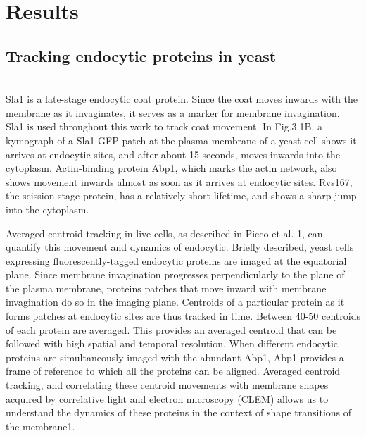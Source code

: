 \chapter{Results}    
\label{Ch:results}

\section{Tracking endocytic proteins in yeast}
\mbox{}\\
Sla1 is a late-stage endocytic coat protein. Since the coat moves inwards with the membrane as it invaginates, it serves as a marker for membrane invagination. Sla1 is used throughout this work to track coat movement. In Fig.3.1B, a kymograph of a Sla1-GFP patch at the plasma membrane of a yeast cell shows it arrives at endocytic sites, and after about 15 seconds, moves inwards into the cytoplasm. Actin-binding protein Abp1, which marks the actin network, also shows movement inwards almost as soon as it arrives at endocytic sites. Rvs167, the scission-stage protein, has a relatively short lifetime, and shows a sharp jump into the cytoplasm. 


\vspace{7mm}
Averaged centroid tracking in live cells, as described in Picco et al. 1, can quantify this movement and dynamics of endocytic. Briefly described, yeast cells expressing fluorescently-tagged endocytic proteins are imaged at the equatorial plane. Since membrane invagination progresses perpendicularly to the plane of the plasma membrane, proteins patches that move inward with membrane invagination do so in the imaging plane. Centroids of a particular protein as it forms patches at endocytic sites are thus tracked in time. Between 40-50 centroids of each protein are averaged. This provides an averaged centroid that can be followed with high spatial and temporal resolution. When different endocytic proteins are simultaneously imaged with the abundant Abp1, Abp1 provides a frame of reference to which all the proteins can be aligned. Averaged centroid tracking, and correlating these centroid movements with membrane shapes acquired by correlative light and electron microscopy (CLEM) allows us to understand the dynamics of these proteins in the context of shape transitions of the membrane1.  


